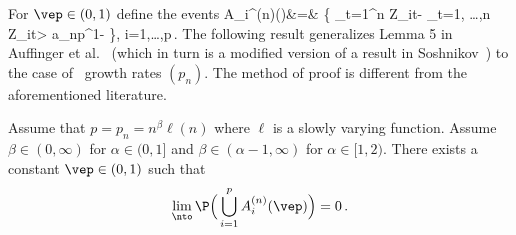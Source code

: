 For $\vep\in (0,1)$
define the events
\beao
A_i^{(n)}(\vep)&=& 
\Big\{ \sum_{t=1}^n Z_{it}- \max_{t=1, \ldots,n} Z_{it}> a_{np}^{1-\vep}  \Big\}, \qquad i=1,\ldots,p\,.
\eeao
The following result generalizes Lemma 5 in 
Auffinger et al.~\cite{auffinger:arous:peche:2009} (which in turn is a 
modified version of a result in Soshnikov~\cite{soshnikov:2004}) to the case of \regvary\ growth rates $(p_n)$.
The method of proof is different from the aforementioned literature.
\begin{lemma}\label{thm:keyresult}
Assume that $p=p_n=n^\beta \ell(n)$ where $\ell$ is a slowly varying function. 
Assume $ \beta\in (0,\infty)$ for $\alpha\in (0,1]$ and $\beta  \in (\alpha-1,\infty)$ for $\alpha\in [1,2)$.
There exists a constant $\vep\in (0,1)$ such that 
\begin{equation*}
\lim_{\nto} \P \Big( \bigcup_{i=1}^p A_i^{(n)}(\vep) \Big)=0\,.
\end{equation*}
\end{lemma}

